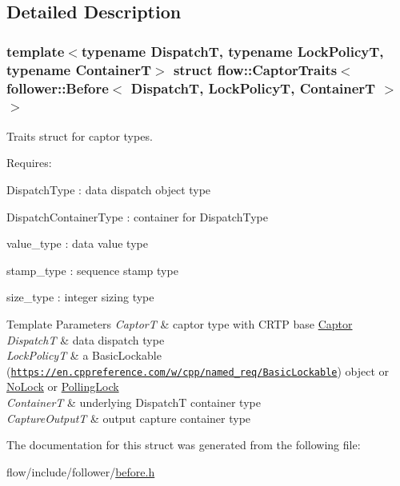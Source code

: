 \subsection{Detailed Description}
\subsubsection*{template$<$typename DispatchT, typename Lock\+PolicyT, typename ContainerT$>$\newline
struct flow\+::\+Captor\+Traits$<$ follower\+::\+Before$<$ Dispatch\+T, Lock\+Policy\+T, Container\+T $>$ $>$}

Traits struct for captor types. 

Requires\+:
\begin{DoxyItemize}
\item {\ttfamily Dispatch\+Type} \+: data dispatch object type
\item {\ttfamily Dispatch\+Container\+Type} \+: container for {\ttfamily Dispatch\+Type}
\item {\ttfamily value\+\_\+type} \+: data value type
\item {\ttfamily stamp\+\_\+type} \+: sequence stamp type
\item {\ttfamily size\+\_\+type} \+: integer sizing type
\end{DoxyItemize}


\begin{DoxyTemplParams}{Template Parameters}
{\em CaptorT} & captor type with C\+R\+TP base {\ttfamily \hyperlink{classflow_1_1_captor}{Captor}}\\
\hline
{\em DispatchT} & data dispatch type \\
\hline
{\em Lock\+PolicyT} & a Basic\+Lockable (\href{https://en.cppreference.com/w/cpp/named_req/BasicLockable}{\tt https\+://en.\+cppreference.\+com/w/cpp/named\+\_\+req/\+Basic\+Lockable}) object or \hyperlink{structflow_1_1_no_lock}{No\+Lock} or \hyperlink{structflow_1_1_polling_lock}{Polling\+Lock} \\
\hline
{\em ContainerT} & underlying {\ttfamily DispatchT} container type \\
\hline
{\em Capture\+OutputT} & output capture container type \\
\hline
\end{DoxyTemplParams}


The documentation for this struct was generated from the following file\+:\begin{DoxyCompactItemize}
\item 
flow/include/follower/\hyperlink{before_8h}{before.\+h}\end{DoxyCompactItemize}
